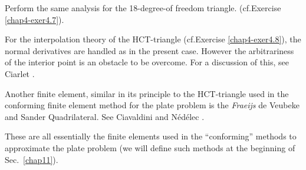 \begin{exercise}\label{chap10-exer10.1}
Perform the same analysis for the 18-degree-of freedom
triangle. (cf.\@ Exercise \ref{chap4-exer4.7}).
\end{exercise}

For the interpolation theory of the HCT-triangle (cf.\@ Exercise
\ref{chap4-exer4.8}), the normal derivatives are handled as in the
present case. However the arbitrariness of the interior point is an
obstacle to be overcome. For a discussion of this, see Ciarlet
\cite{key4}. 

Another finite element, similar in its principle to the HCT-triangle
used in the conforming finite element method for the plate problem is
the {\em Fraeijs} de Veubeke and Sander Quadrilateral. See Ciavaldini
and N\'ed\'elec \cite{key9}.

These are all essentially the finite elements used in the
``conforming'' methods to approximate the plate problem (we will
define such methods at the beginning of Sec.~\ref{chap11}).








